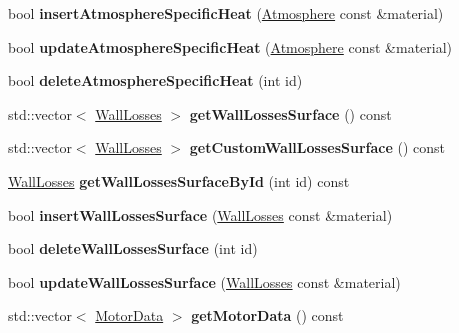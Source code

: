 \begin{DoxyCompactItemize}
bool {\bfseries insert\+Atmosphere\+Specific\+Heat} (\hyperlink{class_atmosphere}{Atmosphere} const \&material)
\item 
\mbox{\label{class_s_q_lite_a0980ef2dfdaadb27f86342f983019bb7}} 
bool {\bfseries update\+Atmosphere\+Specific\+Heat} (\hyperlink{class_atmosphere}{Atmosphere} const \&material)
\item 
\mbox{\label{class_s_q_lite_a32f61e2c425864cf222ee427abd33448}} 
bool {\bfseries delete\+Atmosphere\+Specific\+Heat} (int id)
\item 
\mbox{\label{class_s_q_lite_a612950dca9d08332a31a020783ba832d}} 
std\+::vector$<$ \hyperlink{class_wall_losses}{Wall\+Losses} $>$ {\bfseries get\+Wall\+Losses\+Surface} () const
\item 
\mbox{\label{class_s_q_lite_a0314139eab40caf617a2e8e465ba3913}} 
std\+::vector$<$ \hyperlink{class_wall_losses}{Wall\+Losses} $>$ {\bfseries get\+Custom\+Wall\+Losses\+Surface} () const
\item 
\mbox{\label{class_s_q_lite_a3a7f473d8e23630dae65cd3c3dd7fa97}} 
\hyperlink{class_wall_losses}{Wall\+Losses} {\bfseries get\+Wall\+Losses\+Surface\+By\+Id} (int id) const
\item 
\mbox{\label{class_s_q_lite_a97d510f6f16aa70c61a9dc6a629ad786}} 
bool {\bfseries insert\+Wall\+Losses\+Surface} (\hyperlink{class_wall_losses}{Wall\+Losses} const \&material)
\item 
\mbox{\label{class_s_q_lite_ab9492a672cb89dfeae330b99ea03ceeb}} 
bool {\bfseries delete\+Wall\+Losses\+Surface} (int id)
\item 
\mbox{\label{class_s_q_lite_ac4b7397ef51a0544d38f670ef995f26e}} 
bool {\bfseries update\+Wall\+Losses\+Surface} (\hyperlink{class_wall_losses}{Wall\+Losses} const \&material)
\item 
\mbox{\label{class_s_q_lite_a654ac1320d5629702346f55f99a648c9}} 
std\+::vector$<$ \hyperlink{class_motor_data}{Motor\+Data} $>$ {\bfseries get\+Motor\+Data} () const
\item 

\end{DoxyCompactItemize}

